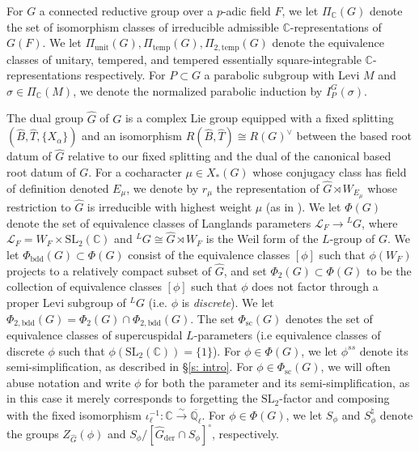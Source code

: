\documentclass[reqno,11pt]{amsart}
\theoremstyle{remark}
\newcommand{\C}{\mathbb{C}}
\newcommand{\mc}{\mathcal}
\newcommand{\Q}{\mathbb{Q}}
\newcommand{\LL}{{}^L}
\newcommand{\der}{\mathrm{der}}
\newcommand{\ov}{\overline}
\newcommand{\temp}{\mathrm{temp}}
\newcommand{\unit}{\mathrm{unit}}
\newcommand{\SL}{\mathrm{SL}}
\newcommand{\bdd}{\mathrm{bdd}}
\newcommand{\scusp}{\mathrm{sc}}
\begin{document}
For $G$ a connected reductive group over a $p$-adic field $F$, we let $\Pi_{\C}(G)$ denote the set of isomorphism classes of irreducible admissible $\C$-representations of $G(F)$. We let $\Pi_{\unit}(G), \Pi_{\temp}(G), \Pi_{2, \temp}(G)$ denote the equivalence classes of unitary, tempered, and tempered essentially square-integrable $\C$-representations respectively. For $P \subset G$ a parabolic subgroup with Levi $M$ and $\sigma \in \Pi_{\C}(M)$, we denote the normalized parabolic induction by $I^G_P(\sigma)$. 

The dual group $\widehat{G}$ of $G$ is a complex Lie group equipped with a fixed splitting $(\hat{B}, \hat{T}, \{X_{\alpha}\})$ and an isomorphism $R(\hat{B}, \hat{T}) \cong R(G)^{\vee}$ between the based root datum of $\widehat{G}$ relative to our fixed splitting and the dual of the canonical based root datum of $G$. For a cocharacter $\mu \in X_*(G)$ whose conjugacy class has field of definition denoted $E_{\mu}$, we denote by $r_{\mu}$ the representation of $\widehat{G} \rtimes W_{E_\mu}$ whose restriction to $\widehat{G}$ is irreducible with highest weight $\mu$ (as in \cite[Lemma 2.1.2]{KottwitzTOO}).  We let $\Phi(G)$ denote the set of equivalence classes of Langlands parameters $\mc{L}_F \to \LL G$, where $\mc{L}_F = W_F \times \SL_2(\C)$ and $\LL G \cong \widehat{G} \rtimes W_F$ is the Weil form of the $L$-group of $G$. We let $\Phi_{\bdd}(G) \subset \Phi(G)$ consist of the equivalence classes $[\phi]$ such that $\phi(W_F)$ projects to a relatively compact subset of $\widehat{G}$, and set $\Phi_2(G) \subset \Phi(G)$ to be the collection of  equivalence classes $[\phi]$ such that $\phi$ does not factor through a proper Levi subgroup of $\LL G$ (i.e. $\phi$ is \emph{discrete}). We let $\Phi_{2, \bdd}(G) = \Phi_2(G) \cap \Phi_{2, \bdd}(G)$. The set $\Phi_{\scusp}(G)$ denotes the set of equivalence classes of supercuspidal $L$-parameters (i.e equivalence classes of discrete $\phi$ such that $\phi(\SL_2(\C))=\{1\}$). For $\phi \in \Phi(G)$, we let $\phi^{ss}$ denote its semi-simplification, as described in \S \ref{s: intro}. For $\phi \in \Phi_{\scusp}(G)$, we will often abuse notation and write $\phi$ for both the parameter and its semi-simplification, as in this case it merely corresponds to forgetting the $\SL_{2}$-factor and composing with the fixed isomorphism $\iota^{-1}_{\ell}: \C \xrightarrow{\sim} \ov{\Q_{\ell}}$. For $\phi \in \Phi(G)$, we let $S_{\phi}$ and $S^{\natural}_{\phi}$ denote the groups $Z_{\widehat{G}}(\phi)$ and $S_{\phi}/[\widehat{G}_{\der} \cap S_{\phi}]^{\circ}$, respectively. 
\end{document}
